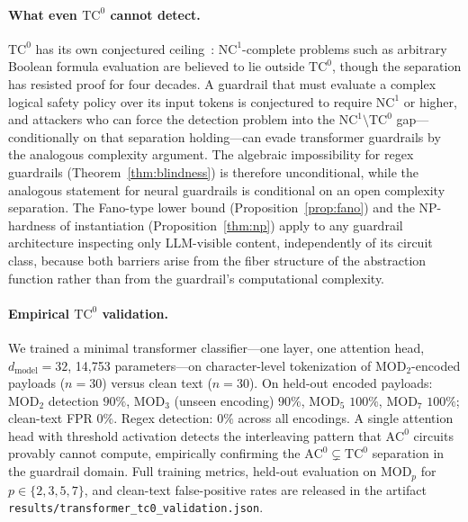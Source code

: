 \documentclass[letterpaper,twocolumn,10pt]{article}
\theoremstyle{definition}
\theoremstyle{remark}
\begin{document}
\paragraph{What even $\mathrm{TC}^0$ cannot detect.}
$\mathrm{TC}^0$ has its own conjectured
ceiling~\cite{sipser2012,barrington1992}: $\mathrm{NC}^1$-complete problems
such as arbitrary Boolean formula evaluation are believed to lie outside
$\mathrm{TC}^0$, though the separation has resisted proof for four decades.
A guardrail that must evaluate a complex logical safety policy over its
input tokens is conjectured to require $\mathrm{NC}^1$ or higher, and
attackers who can force the detection problem into the
$\mathrm{NC}^1 \setminus \mathrm{TC}^0$ gap---conditionally on that
separation holding---can evade transformer guardrails by the analogous
complexity argument.
The algebraic impossibility for regex guardrails
(Theorem~\ref{thm:blindness}) is therefore unconditional, while the
analogous statement for neural guardrails is conditional on an open
complexity separation.
The Fano-type lower bound (Proposition~\ref{prop:fano}) and the NP-hardness
of instantiation (Proposition~\ref{thm:np}) apply to any guardrail
architecture inspecting only LLM-visible content, independently of its
circuit class, because both barriers arise from the fiber structure of
the abstraction function rather than from the guardrail's computational
complexity.

\paragraph{Empirical $\mathrm{TC}^0$ validation.}
We trained a minimal transformer classifier---one layer, one attention head,
$d_\text{model}{=}32$, 14,753 parameters---on character-level tokenization of
$\mathrm{MOD}_2$-encoded payloads ($n{=}30$) versus clean text ($n{=}30$).
On held-out encoded payloads: $\mathrm{MOD}_2$ detection $90\%$,
$\mathrm{MOD}_3$ (unseen encoding) $90\%$, $\mathrm{MOD}_5$ $100\%$,
$\mathrm{MOD}_7$ $100\%$; clean-text FPR $0\%$.
Regex detection: $0\%$ across all encodings.
A single attention head with threshold activation detects the interleaving
pattern that $\mathrm{AC}^0$ circuits provably cannot compute,
empirically confirming the $\mathrm{AC}^0 \subsetneq \mathrm{TC}^0$
separation in the guardrail domain. Full training metrics, held-out evaluation
on $\mathrm{MOD}_p$ for $p \in \{2,3,5,7\}$, and clean-text false-positive
rates are released in the artifact \texttt{results/\allowbreak transformer\_\allowbreak tc0\_\allowbreak validation.json}.
\end{document}
